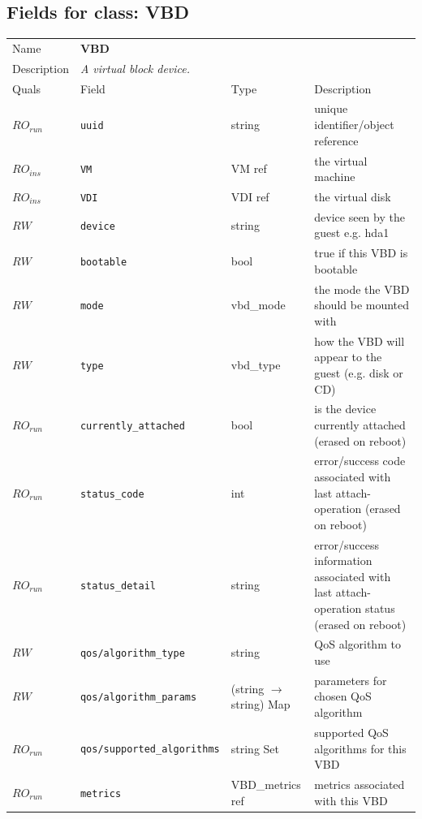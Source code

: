 \subsection{Fields for class: VBD}
\begin{longtable}{|lllp{}|}
\hline
\multicolumn{1}{|l}{Name} & \multicolumn{3}{l|}{\bf VBD} \\
\multicolumn{1}{|l}{Description} & \multicolumn{3}{l|}{\parbox{11cm}{\em A
virtual block device.}} \\
\hline
Quals & Field & Type & Description \\
\hline
$\mathit{RO}_\mathit{run}$ &  {\tt uuid} & string & unique identifier/object reference \\
$\mathit{RO}_\mathit{ins}$ &  {\tt VM} & VM ref & the virtual machine \\
$\mathit{RO}_\mathit{ins}$ &  {\tt VDI} & VDI ref & the virtual disk \\
$\mathit{RW}$ &  {\tt device} & string & device seen by the guest e.g. hda1 \\
$\mathit{RW}$ &  {\tt bootable} & bool & true if this VBD is bootable \\
$\mathit{RW}$ &  {\tt mode} & vbd\_mode & the mode the VBD should be mounted with \\
$\mathit{RW}$ &  {\tt type} & vbd\_type & how the VBD will appear to the guest (e.g. disk or CD) \\
$\mathit{RO}_\mathit{run}$ &  {\tt currently\_attached} & bool & is the device currently attached (erased on reboot) \\
$\mathit{RO}_\mathit{run}$ &  {\tt status\_code} & int & error/success code associated with last attach-operation (erased on reboot) \\
$\mathit{RO}_\mathit{run}$ &  {\tt status\_detail} & string & error/success information associated with last attach-operation status (erased on reboot) \\
$\mathit{RW}$ &  {\tt qos/algorithm\_type} & string & QoS algorithm to use \\
$\mathit{RW}$ &  {\tt qos/algorithm\_params} & (string $\rightarrow$ string) Map & parameters for chosen QoS algorithm \\
$\mathit{RO}_\mathit{run}$ &  {\tt qos/supported\_algorithms} & string Set & supported QoS algorithms for this VBD \\
$\mathit{RO}_\mathit{run}$ &  {\tt metrics} & VBD\_metrics ref & metrics associated with this VBD \\
\hline
\end{longtable}
